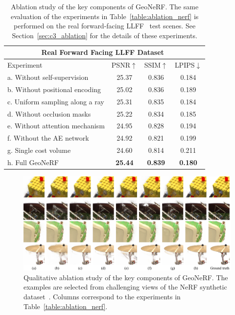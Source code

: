 \begin{table}[!t]
	\begin{center}
		\begin{tabular}{l|ccc}
			\hline
                \multicolumn{4}{c}{Real Forward Facing LLFF Dataset~\citep{mildenhall2019llff}} \\
                \hline
			Experiment & PSNR$\uparrow$ &  SSIM$\uparrow$ & LPIPS$\downarrow$ \\
			\hline
			a. Without self-supervision & 25.37 & 0.836 & 0.184 \\
			b. Without positional encoding & 25.02 & 0.836 & 0.189 \\
			c. Uniform sampling along a ray & 25.31 & 0.835 & 0.184 \\
			d. Without occlusion masks & 25.22 & 0.834 & 0.185 \\
			e. Without attention mechanism & 24.95 & 0.828 & 0.194 \\
			f. Without the AE network & 24.92 & 0.821 & 0.199 \\
			g. Single cost volume & 24.60 & 0.814 & 0.211 \\
			h. Full GeoNeRF & \textbf{25.44} & \textbf{0.839} & \textbf{0.180}\\
			\hline
		\end{tabular}
	\end{center}
	\caption{Ablation study of the key components of GeoNeRF. The same evaluation of the experiments in Table~\ref{table:ablation_nerf} is performed on the real forward-facing LLFF~\citep{mildenhall2019llff} test scenes. See Section~\ref{sec:c3_ablation} for the details of these experiments.}
	\label{table:ablation_llff}
\end{table}

\begin{figure}
	\begin{center}
		\includegraphics[width=1.0\linewidth]{images/chapter3/figures/ablation.jpg}
	\end{center}
	\caption{Qualitative ablation study of the key components of GeoNeRF. The examples are selected from challenging views of the NeRF synthetic dataset~\citep{mildenhall2020nerf}. Columns correspond to the experiments in Table~\ref{table:ablation_nerf}.}
	\label{fig:c3_ablation}
\end{figure}

